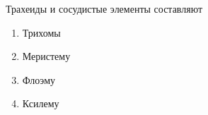 
Трахеиды и сосудистые элементы составляют

\begin{enumerate}
    \item Трихомы
    \item Меристему
    \item Флоэму
    \item Ксилему
\end{enumerate}



